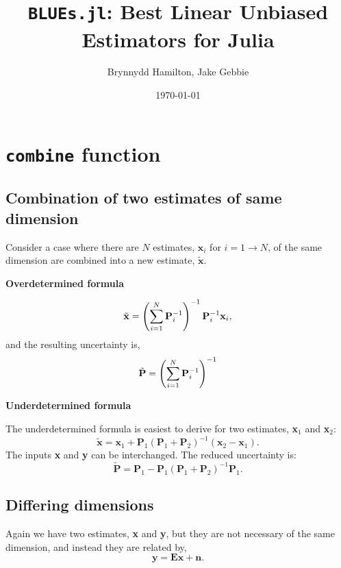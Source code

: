 \documentclass{article}
\title{\texttt{BLUEs.jl}: Best Linear Unbiased Estimators for Julia}
\author{Brynnydd Hamilton, Jake Gebbie}
\date{\today}
\begin{document}
\maketitle

\section{\texttt{combine} function}

\subsection{Combination of two estimates of same dimension}
\label{sec:basic-form}

Consider a case where there are $N$ estimates, $\mathbf{x}_i$ for $i = 1 \rightarrow N$, of the same dimension are combined into a new estimate, $\tilde{\mathbf{x}}$.

\textbf{{Overdetermined formula}}

\begin{equation}
\label{eq:18}
\tilde{\mathbf{x}} = \left(\sum_{i=1}^N {\bf P}_i^{-1}\right)^{-1} {\bf P}_i^{-1} {\bf x}_i,
\end{equation}
and the resulting uncertainty is,
\begin{equation}
\label{eq:19}
\tilde{{\bf P}} = \left(\sum_{i=1}^N{\bf P}_i^{-1}\right)^{-1}
\end{equation}

\textbf{{Underdetermined formula}}

The underdetermined formula is easiest to derive for two estimates, \textbf{x}$_1$ and \textbf{x}$_2$:
\begin{equation}
\label{eq:15}
\tilde{\mathbf{x}} = \mathbf{x}_{1} + \mathbf{P}_1 (\mathbf{P}_1 + \mathbf{P}_2 )^{-1} (\mathbf{x}_2 - \mathbf{x}_1) .
\end{equation}
The inputs \textbf{x} and \textbf{y} can be interchanged. The reduced uncertainty is:
\begin{equation}
\label{eq:16}
\tilde{\mathbf{P}} = \mathbf{P}_1 - \mathbf{P}_1 (\mathbf{P}_1 + \mathbf{P}_2 )^{-1} \mathbf{P}_1.
\end{equation}

\subsection{Differing dimensions}
\label{sec:differing-dimensions}

Again we have two estimates, \textbf{x} and \textbf{y}, but they are not necessary of the same dimension, and instead they are related by,
\begin{equation}
\label{eq:17}
\mathbf{y} = \mathbf{Ex} + \mathbf{n}.
\end{equation}
\end{document}

